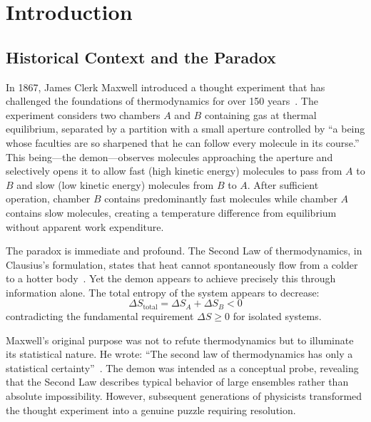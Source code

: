 \documentclass[twocolumn,showpacs,preprintnumbers,amsmath,amssymb,prd]{revtex4-2}
\theoremstyle{definition}
\theoremstyle{remark}
\begin{document}
\maketitle

\section{Introduction}
\label{sec:introduction}

\subsection{Historical Context and the Paradox}

In 1867, James Clerk Maxwell introduced a thought experiment that has challenged the foundations of thermodynamics for over 150 years~\cite{maxwell1871theory}. The experiment considers two chambers $A$ and $B$ containing gas at thermal equilibrium, separated by a partition with a small aperture controlled by ``a being whose faculties are so sharpened that he can follow every molecule in its course.'' This being---the demon---observes molecules approaching the aperture and selectively opens it to allow fast (high kinetic energy) molecules to pass from $A$ to $B$ and slow (low kinetic energy) molecules from $B$ to $A$. After sufficient operation, chamber $B$ contains predominantly fast molecules while chamber $A$ contains slow molecules, creating a temperature difference from equilibrium without apparent work expenditure.

The paradox is immediate and profound. The Second Law of thermodynamics, in Clausius's formulation, states that heat cannot spontaneously flow from a colder to a hotter body~\cite{clausius1865mechanical}. Yet the demon appears to achieve precisely this through information alone. The total entropy of the system appears to decrease:
\begin{equation}
\Delta S_{\text{total}} = \Delta S_A + \Delta S_B < 0
\label{eq:entropy_decrease}
\end{equation}
contradicting the fundamental requirement $\Delta S \geq 0$ for isolated systems.

Maxwell's original purpose was not to refute thermodynamics but to illuminate its statistical nature. He wrote: ``The second law of thermodynamics has only a statistical certainty''~\cite{maxwell1878tait}. The demon was intended as a conceptual probe, revealing that the Second Law describes typical behavior of large ensembles rather than absolute impossibility. However, subsequent generations of physicists transformed the thought experiment into a genuine puzzle requiring resolution.
\end{document}
